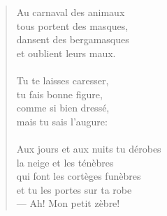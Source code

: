 \documentclass[twocolumn,12pt,a4paper]{article}
\begin{document}
\begin{verse}
Au carnaval des animaux\\
tous portent des masques,\\
dansent des bergamasques\\
et oublient leurs maux.\\
\ \\

Tu te laisses caresser,\\
tu fais bonne figure,\\
comme si bien dressé,\\
mais tu sais l'augure:\\
\ \\

Aux jours et aux nuits tu dérobes\\
la neige et les ténèbres\\
qui font les cortèges funèbres\\
et tu les portes sur ta robe\\
--- Ah! Mon petit zèbre!
\end{verse}
\end{document}
